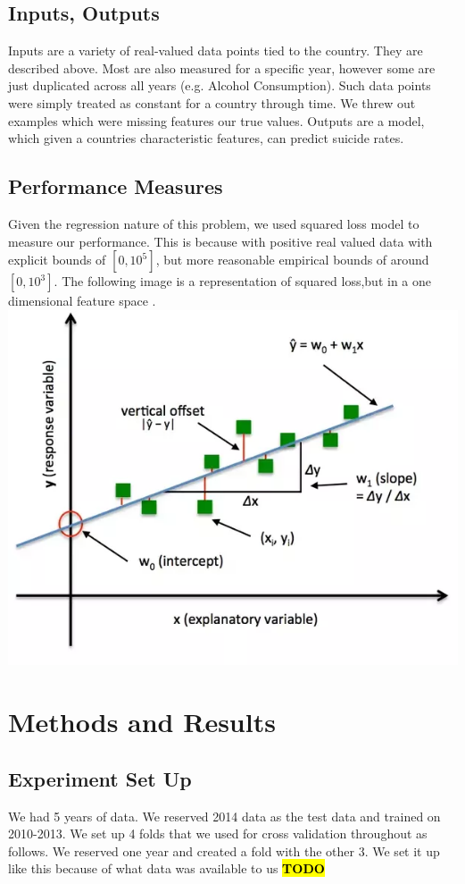 \documentclass{article}
\newcommand{\TODO}{\textcolor{red}{\textbf{\hl{TODO}}}}
\begin{document}
\begin{multicols}{2}
\subsection{Inputs, Outputs} Inputs are a variety of real-valued data points tied to the country. They are described above. Most are also measured for a specific year, however some are just duplicated across all years (e.g. Alcohol Consumption). Such data points were simply treated as constant for a country through time. We threw out examples which were missing features our true values. Outputs are a model, which given a countries characteristic features, can predict suicide rates. 
\subsection{Performance Measures} Given the regression nature of this problem, we used squared loss model to measure our performance. This is because with positive real valued data with explicit bounds of $[0, 10^5]$, but more reasonable empirical bounds of around $[0, 10^3]$. The following image is a representation of squared loss,but in a one dimensional feature space . 
\includegraphics[width=\columnwidth]{squared-loss.png}


\section{Methods and Results}
\subsection{Experiment Set Up} We had 5 years of data. We reserved 2014 data as the test data and trained on 2010-2013. We set up 4 folds that we used for cross validation throughout as follows. We reserved one year and created a fold with the other 3. We set it up like this because of what data was available to us \TODO


\end{multicols}
\end{document}

